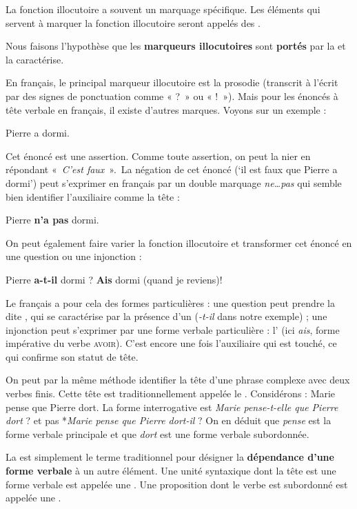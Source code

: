 La fonction illocutoire a souvent un marquage spécifique. Les éléments qui servent à marquer la fonction illocutoire seront appelés des .

{Nous faisons l’hypothèse que les \textbf{marqueurs illocutoires} sont \textbf{portés} par la  et la caractérise.}

En français, le principal marqueur illocutoire est la prosodie (transcrit à l’écrit par des signes de ponctuation comme « ?~» ou « !~»). Mais pour les énoncés à tête verbale en français, il existe d’autres marques. Voyons sur un exemple :

\ea
{Pierre a dormi}.
\z

Cet énoncé est une assertion. Comme toute assertion, on peut la nier en répondant «~\textit{C’est faux}~».~La négation de cet énoncé (‘il est faux que Pierre a dormi’) peut s’exprimer en français par un double marquage \textit{ne…pas} qui semble bien identifier l’auxiliaire comme la tête :

\ea
{Pierre} \textbf{{n’a}  {pas}}  {dormi.}
\z

On peut également faire varier la fonction illocutoire et transformer cet énoncé en une question ou une injonction :

\ea
  \ea Pierre \textbf{a-t-il} dormi ?
  \ex \textbf{Ais}  dormi (quand  je reviens)!
  \z
\z

Le français a pour cela des formes particulières : une question peut prendre la  dite , qui se caractérise par la présence d’un  (\textit{{}-t-il} dans notre exemple) ; une injonction peut s’exprimer par une forme verbale particulière : l’ (ici \textit{ais}, forme impérative du verbe \textsc{avoir}). C’est encore une fois l’auxiliaire qui est touché, ce qui confirme son statut de tête.

On peut par la même méthode identifier la tête d’une phrase complexe avec deux verbes finis. Cette tête est traditionnellement appelée le . Considérons :
\ea
{Marie pense que Pierre dort}.
\z
La forme interrogative est \textit{Marie pense-t-elle que Pierre dort} ? et pas *\textit{Marie pense que Pierre dort-il} ? On en déduit que \textit{pense} est la forme verbale principale et que \textit{dort} est une forme verbale subordonnée.

{La  est simplement le terme traditionnel pour désigner la \textbf{dépendance d’une} \textbf{forme verbale} à un autre élément. Une unité syntaxique dont la tête est une forme verbale est appelée une . Une proposition dont le verbe est subordonné est appelée une .}

